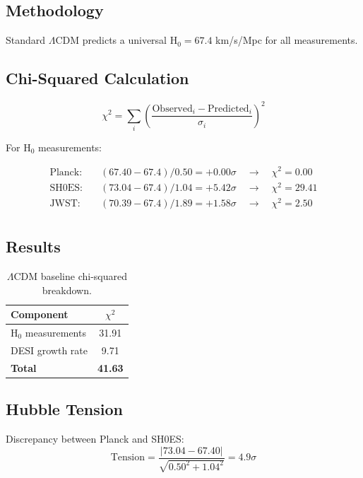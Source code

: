 \documentclass[11pt,letterpaper]{article}
\begin{document}
\subsection{Methodology}

Standard $\Lambda$CDM predicts a universal H$_0 = 67.4$ km/s/Mpc for all measurements.

\subsection{Chi-Squared Calculation}

\begin{equation}
\chi^2 = \sum_i \left(\frac{\text{Observed}_i - \text{Predicted}_i}{\sigma_i}\right)^2
\end{equation}

\noindent For H$_0$ measurements:

\begin{align*}
\text{Planck:} \quad & (67.40 - 67.4)/0.50 = +0.00\sigma \quad \rightarrow \quad \chi^2 = 0.00 \\
\text{SH0ES:} \quad & (73.04 - 67.4)/1.04 = +5.42\sigma \quad \rightarrow \quad \chi^2 = 29.41 \\
\text{JWST:} \quad & (70.39 - 67.4)/1.89 = +1.58\sigma \quad \rightarrow \quad \chi^2 = 2.50 \\
\end{align*}

\subsection{Results}

\begin{table}[h]
\centering
\begin{tabular}{lc}
\toprule
Component & $\chi^2$ \\
\midrule
H$_0$ measurements & 31.91 \\
DESI growth rate & 9.71 \\
\midrule
\textbf{Total} & \textbf{41.63} \\
\bottomrule
\end{tabular}
\caption{$\Lambda$CDM baseline chi-squared breakdown.}
\end{table}

\subsection{Hubble Tension}

Discrepancy between Planck and SH0ES:
\begin{equation}
\text{Tension} = \frac{|73.04 - 67.40|}{\sqrt{0.50^2 + 1.04^2}} = 4.9\sigma
\end{equation}
\end{document}
